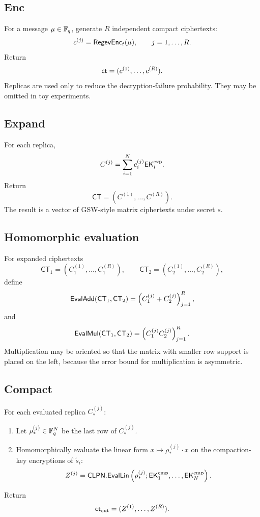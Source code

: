 \subsection{Enc}

For a message $\mu\in\mathbb{F}_q$, generate $R$ independent compact ciphertexts:
\[
    c^{(j)}=\mathsf{Regev}\mathsf{Enc}_t(\mu),\qquad j=1,\ldots,R.
\]
Return
\[
    \mathsf{ct}=(c^{(1)},\ldots,c^{(R)}).
\]
Replicas are used only to reduce the decryption-failure probability.  They may be omitted in toy experiments.

\subsection{Expand}

For each replica,
\[
    C^{(j)}=\sum_{i=1}^{N}c_i^{(j)}\mathsf{EK}^{\rm exp}_i.
\]
Return
\[
    \mathsf{CT}=(C^{(1)},\ldots,C^{(R)}).
\]
The result is a vector of GSW-style matrix ciphertexts under secret $s$.

\subsection{Homomorphic evaluation}

For expanded ciphertexts
\[
    \mathsf{CT}_1=(C_1^{(1)},\ldots,C_1^{(R)}),
    \qquad
    \mathsf{CT}_2=(C_2^{(1)},\ldots,C_2^{(R)}),
\]
define
\[
    \mathsf{EvalAdd}(\mathsf{CT}_1,\mathsf{CT}_2)=
    \left(C_1^{(j)}+C_2^{(j)}\right)_{j=1}^{R},
\]
and
\[
    \mathsf{EvalMul}(\mathsf{CT}_1,\mathsf{CT}_2)=
    \left(C_1^{(j)}C_2^{(j)}\right)_{j=1}^{R}.
\]
Multiplication may be oriented so that the matrix with smaller row support is placed on the left, because the error bound for multiplication is asymmetric.

\subsection{Compact}

For each evaluated replica $C_*^{(j)}$:
\begin{enumerate}
    \item Let $\rho_*^{(j)}\in\mathbb{F}_q^N$ be the last row of $C_*^{(j)}$.
    \item Homomorphically evaluate the linear form $x\mapsto\rho_*^{(j)}\cdot x$ on the compaction-key encryptions of $\tilde{s}_i$:
    \[
        Z^{(j)}=
        \mathsf{CLPN.EvalLin}
        \left(\rho_*^{(j)};
        \mathsf{EK}^{\rm cmp}_1,\ldots,\mathsf{EK}^{\rm cmp}_N\right).
    \]
\end{enumerate}
Return
\[
    \mathsf{ct}_{\rm out}=(Z^{(1)},\ldots,Z^{(R)}).
\]

